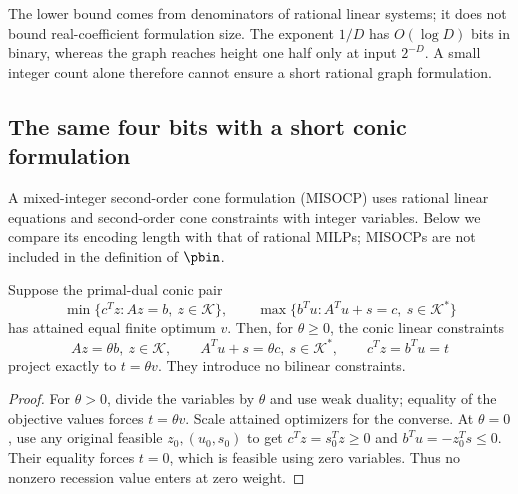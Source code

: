 The lower bound comes from denominators of rational linear systems; it
does not bound real-coefficient formulation size. The exponent $1/D$
has $O(\log D)$ bits in binary, whereas the graph reaches height one
half only at input $2^{-D}$. A small integer count alone therefore
cannot ensure a short rational graph formulation.

\subsection{The same four bits with a short conic formulation}

A mixed-integer second-order cone formulation (MISOCP) uses rational
linear equations and second-order cone constraints with integer
variables. Below we compare its encoding length with that of rational
MILPs; MISOCPs are not included in the definition of $\pbin$.

\begin{lemma}\label{lem:conic-value}
Suppose the primal-dual conic pair
\[
 \min\{c^Tz:Az=b,\ z\in\mathcal K\},\qquad
 \max\{b^Tu:A^Tu+s=c,\ s\in\mathcal K^*\}
\]
has attained equal finite optimum $v$. Then, for $\theta\ge0$,
the conic linear constraints
\begin{equation}\label{eq:conic-value-homogeneous}
 Az=\theta b,\ z\in\mathcal K,\qquad
 A^Tu+s=\theta c,\ s\in\mathcal K^*,\qquad
 c^Tz=b^Tu=t
\end{equation}
project exactly to $t=\theta v$. They introduce no bilinear constraints.
\end{lemma}
\begin{proof}
For $\theta>0$, divide the variables by $\theta$ and use weak
duality; equality of the objective values forces $t=\theta v$.
Scale attained optimizers for the converse. At $\theta=0$, use any
original feasible $z_0,(u_0,s_0)$ to get
$c^Tz=s_0^Tz\ge0$ and $b^Tu=-z_0^Ts\le0$. Their equality forces
$t=0$, which is feasible using zero variables. Thus no nonzero
recession value enters at zero weight.
\end{proof}

